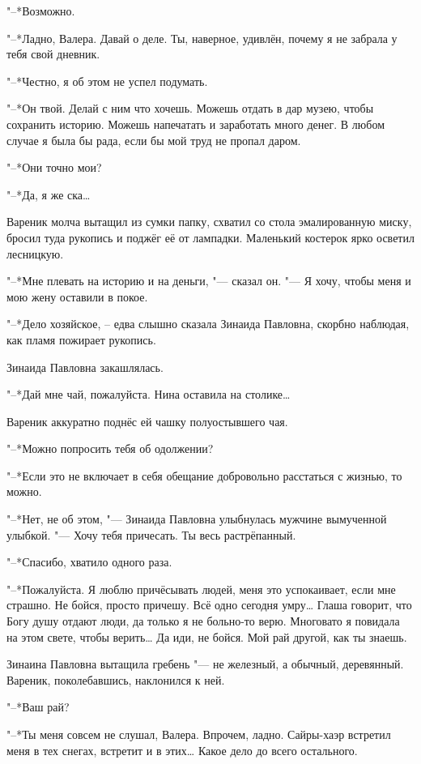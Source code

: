"--*Возможно.

"--*Ладно, Валера.
Давай о деле.
Ты, наверное, удивлён, почему я не забрала у тебя свой дневник.

"--*Честно, я об этом не успел подумать.

"--*Он твой.
Делай с ним что хочешь.
Можешь отдать в дар музею, чтобы сохранить историю.
Можешь напечатать и заработать много денег.
В любом случае я была бы рада, если бы мой труд не пропал даром.

"--*Они точно мои?

"--*Да, я же ска\ldots{}

Вареник молча вытащил из сумки папку, схватил со стола эмалированную миску, бросил туда рукопись и поджёг её от лампадки.
Маленький костерок ярко осветил лесницкую.

"--*Мне плевать на историю и на деньги, "--- сказал он.
"--- Я хочу, чтобы меня и мою жену оставили в покое.

"--*Дело хозяйское, -- едва слышно сказала Зинаида Павловна, скорбно наблюдая, как пламя пожирает рукопись.

Зинаида Павловна закашлялась.

"--*Дай мне чай, пожалуйста.
Нина оставила на столике\ldots{}

Вареник аккуратно поднёс ей чашку полуостывшего чая.

"--*Можно попросить тебя об одолжении?

"--*Если это не включает в себя обещание добровольно расстаться с жизнью, то можно.

"--*Нет, не об этом, "--- Зинаида Павловна улыбнулась мужчине вымученной улыбкой.
"--- Хочу тебя причесать.
Ты весь растрёпанный.

"--*Спасибо, хватило одного раза.

"--*Пожалуйста.
Я люблю причёсывать людей, меня это успокаивает, если мне страшно.
Не бойся, просто причешу.
Всё одно сегодня умру\ldots{}
Глаша говорит, что Богу душу отдают люди, да только я не больно-то верю.
Многовато я повидала на этом свете, чтобы верить\ldots{}
Да иди, не бойся.
Мой рай другой, как ты знаешь.

Зинаина Павловна вытащила гребень "--- не железный, а обычный, деревянный.
Вареник, поколебавшись, наклонился к ней.

"--*Ваш рай?

"--*Ты меня совсем не слушал, Валера.
Впрочем, ладно.
Сайры-хаэр встретил меня в тех снегах, встретит и в этих\ldots{}
Какое дело до всего остального.


